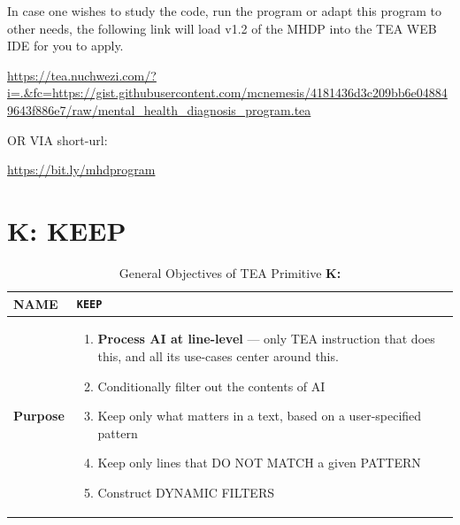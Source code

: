 \documentclass[a4paper, 18pt]{book} %
\begin{document}
\vspace{2em}

In case one wishes to study the code, run the program or adapt this program to other needs, the following link will load v1.2 of the MHDP into the TEA WEB IDE for you to apply.

\vspace{1em}

 \url{https://tea.nuchwezi.com/?i=.&fc=https://gist.githubusercontent.com/mcnemesis/4181436d3c209bb6e048849643f886e7/raw/mental_health_diagnosis_program.tea}

\vspace{1em}
OR VIA short-url:

\vspace{1em}

 \url{https://bit.ly/mhdprogram}

\vspace{1em}



\chapter{K: KEEP}
\label{CHAPK}


\begin{table}[H]
  \centering
  \LARGE
	\begin{tabular}[t]{|p{}|p{}}
 
	\textbf{NAME} & \texttt{KEEP}\\
	\hline
	\textbf{Purpose} & \begin{enumerate}
	\item \textbf{Process AI at line-level} --- {\small only TEA instruction that does this, and all its use-cases center around this.}
	\item Conditionally filter out the contents of AI
	\item Keep only what matters in a text, based on a user-specified pattern
	
	\item Keep only lines that DO NOT MATCH a given PATTERN
	\item Construct DYNAMIC FILTERS
	\end{enumerate}\\
	\hline
	              
\end{tabular}
\caption{General Objectives of TEA Primitive \textbf{K:}}
  \label{TABTAZK}
\end{table}
\end{document}
